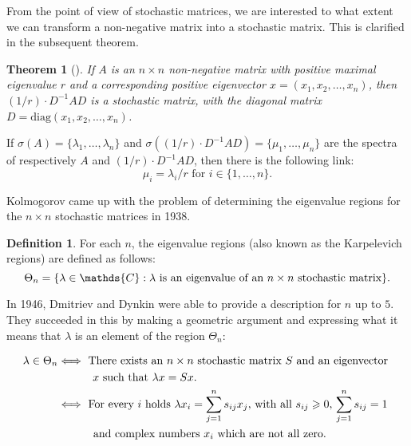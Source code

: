 \documentclass[11pt,a4paper]{article}
\newtheorem{theorem}{Theorem}[section]
\theoremstyle{definition}
\newtheorem{definition}{Definition}[section]
\theoremstyle{remark}
\begin{document}
From the point of view of stochastic matrices, we are interested to what extent we can transform a non-negative matrix into a stochastic matrix. This is clarified in the subsequent theorem.

\begin{theorem}[\cite{minc1988nonnegative}]\label{Minc}
    If \(A\) is an \( n \times n\) non-negative matrix with positive maximal eigenvalue \(r\) and a corresponding positive eigenvector \(x = (x_1, x_2, \ldots, x_n)\), then \( (1/r) \cdot D^{-1}AD \) is a stochastic matrix, with the diagonal matrix \(D = \text{diag}(x_1, x_2, \ldots , x_n)\).
\end{theorem}

If \( \sigma(A) = \{\lambda_1, \ldots, \lambda_{n} \}\) and  \( \sigma((1/r) \cdot D^{-1}AD) = \{\mu_1, \ldots, \mu_{n} \}\) are the spectra of respectively \(A\) and \((1/r) \cdot D^{-1}AD\), then there is the following link:
        \[\mu_i = \lambda_i/r \text{ for } i \in \{1, \ldots, n\}.\]

Kolmogorov came up with the problem of determining the eigenvalue regions for the \(n \times n\) stochastic matrices in 1938.

\begin{definition} For each \(n\), the eigenvalue regions (also known as the Karpelevich regions) are defined as follows:
    \[ \Theta_n = \{ \lambda \in \mathds{C} : \lambda \text{ is an eigenvalue of an \(n \times n\) \hfill \\ stochastic  matrix}  \}.\]
\end{definition}

In 1946, Dmitriev and Dynkin \cite{Dynkin} were able to provide a description for \(n\) up to \(5\). They succeeded in this by making a geometric argument and expressing what it means that \(\lambda\) is an element of the region \(\Theta_n \):

\[ \begin{split}
    \lambda \in \Theta_n &\Longleftrightarrow \text{ There exists an \(n \times n\) stochastic matrix } S \text{ and} \text{ an eigenvector } \\ & \hspace{11mm} x  \text{ such that } \lambda x = S x.\\
    &\Longleftrightarrow \text{ For every } i \text{ holds }\lambda x_i = \sum_{j=1}^{n} s_{ij}x_j \text{, with all \(s_{ij} \geqslant 0 \), \( \sum_{j=1}^{n}s_{ij} = 1\)} \\ & \hspace{10mm} \text{ and complex numbers \(x_i\) which are not all zero.}
    \end{split}
\]
\end{document}
